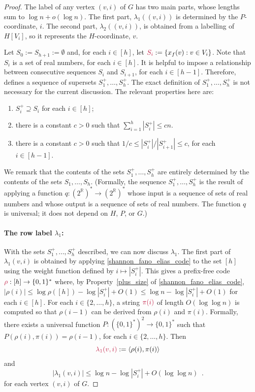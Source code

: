 \documentclass[twoside,leqno]{article}
\makeatletter
\newcommand{\R}{\mathbb{R}}
\renewcommand{\le}{\leqslant}
\newcommand{\defin}[1]{\emph{\textcolor{brightmaroon}{#1}}}
\def\mathcolor#1#{\@mathcolor{#1}}
\def\@mathcolor#1#2#3{%
  \protect\leavevmode
  \begingroup
    \color#1{#2}#3%
  \endgroup
}
\newcommand{\mathdefin}[1]{\mathcolor{brightmaroon}{#1}}
\newcommand{\Oh}{O}
\makeatother
\begin{document}
\begin{proof}
  The label of any vertex $(v,i)$ of $G$ has two main parts, whose lengths sum to $\log n+o(\log n)$.
  The first part, $\lambda_1((v,i))$ is determined by the $P$-coordinate, $i$.
  The second part, $\lambda_2((v,i))$, is obtained from a labelling of $H[V_i]$, so it represents the $H$-coordinate, $v$.

  Let $S_0:=S_{h+1}:=\emptyset$ and,
  for each $i\in[h]$, let $\mathdefin{S_i}:=\{x_f(v):v\in V_i\}$.
  Note that $S_i$ is a set of real numbers, for each $i\in[h]$.
  It is helpful to impose a relationship between consecutive sequences $S_i$ and $S_{i+1}$, for each $i\in[h-1]$. Therefore, \cite{dujmovic.esperet.ea:adjacency} defines a sequence of supersets \defin{$S^+_1,\ldots,S^+_h$}. The exact definition of $S^+_1,\ldots,S^+_h$ is not necessary for the current discussion.
  The relevant properties here are:
  \begin{enumerate}[nosep,label=(\alph*)]
    \item\label{plus_superset} $S^+_i\supseteq S_i$ for each $i\in[h]$;
    \item\label{plus_size} there is a constant $c>0$ such that $\sum_{i=1}^h |S^+_i|\le cn$.
    \item\label{plus_ratio} there is a constant $c>0$ such that
          $1/c\le |S^+_i|/|S^+_{i+1}|\le c$, for each $i\in[h-1]$.
  \end{enumerate}
  We remark that the contents of the sets $S^+_1,\ldots,S^+_h$ are entirely determined by the contents of the sets $S_1,\ldots,S_h$.
  (Formally, the sequence $S^+_1,\ldots,S^+_h$ is the result of applying a function $q:(2^\R)^*\to (2^\R)^*$ whose input is a sequence of sets of real numbers and whose output is a sequence of sets of real numbers. The function $q$ is universal; it does not depend on $H$, $P$, or $G$.)

  \paragraph{The row label $\lambda_1$:}
  With the sets $S^+_1,\ldots,S^+_h$ described, we can now discuss $\lambda_1$.
  The first part of $\lambda_1(v,i)$ is obtained by applying \cref{shannon_fano_elias_code} to the set $[h]$ using the weight function defined by $i \mapsto |S^+_i|$. This gives a prefix-free code $\mathdefin{\rho}:[h]\to\{0,1\}^*$ where, by Property~\ref{plus_size} of \cref{shannon_fano_elias_code}, $|\rho(i)|\le \log\rho([h]) - \log|S^+_i| + \Oh(1)\le \log n - \log|S^+_i| + \Oh(1)$ for each $i\in[h]$.
  For each $i\in\{2,\ldots,h\}$, a string $\mathdefin{\pi(i)}$ of length $\Oh(\log\log n)$ is computed so that $\rho(i-1)$ can be derived from $\rho(i)$ and $\pi(i)$.  Formally, there exists a universal function $P:(\{0,1\}^*)^2\to\{0,1\}^*$ such that $P(\rho(i),\pi(i))=\rho(i-1)$, for each $i\in\{2,\ldots,h\}$.
  Then
  \[
    \mathdefin{\lambda_1(v,i)}:=\langle \rho(i),\pi(i)\rangle
  \]
  and
  \begin{equation}
    |\lambda_1(v,i)|\le \log n - \log |S^+_i| + \Oh(\log\log n) \enspace .
    \label{lambda_one_length}
  \end{equation}
  for each vertex $(v,i)$ of $G$.


\end{proof}
\end{document}
